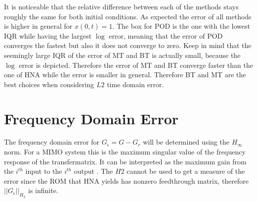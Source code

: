 It is noticeable that the relative difference between each of the methods stays roughly the same for both initial conditions.
As expected the error of all methods is higher in general for \(x(0, t) = 1\).
The box for POD is the one with the lowest IQR while having the largest \(\log\) error, meaning that the error of POD converges the fastest but also it does not converge to zero.
Keep in mind that the seemingly large IQR of the error of MT and BT is actually small, because the \(\log\) error is depicted.
Therefore the error of MT and BT converge faster than the one of HNA while the error is smaller in general.
Therefore BT and MT are the best choices when considering \(L2\) time domain error.



\section{Frequency Domain Error}
The frequency domain error for \(G_{\epsilon }= G - G_r\) will be determined using the \(H_{\infty}\) norm.
For a MIMO system this is the maximum singular value of the frequency response of the transfermatrix.
It can be interpreted as the maximum gain from the \(i^{th}\) input to the \(i^{th}\) output \cite{eugenio}.
The \(H2\) cannot be used to get a measure of the error since the ROM that HNA yields has nonzero feedthrough matrix, therefore \(||G_{\epsilon}||_{H_{2}}\) is infinite. 

